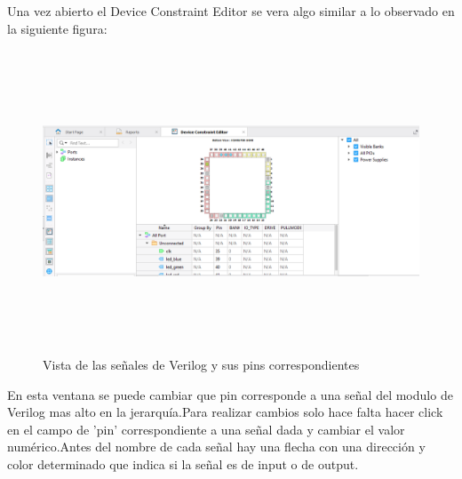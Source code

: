 \documentclass{article}
\begin{document}
 Una vez abierto el Device Constraint Editor se vera algo similar a lo observado en la siguiente figura:
 	\begin{figure}[H]
 	\centering
	\includegraphics[height=9cm,width=16cm]{Imagenes/DeviceConstraintEditor.png}
	\caption{Vista de las señales de Verilog y sus pins correspondientes}
	\end{figure}
 En esta ventana se puede cambiar que pin corresponde a una señal del modulo de Verilog mas alto en la jerarquía.Para realizar cambios solo hace falta hacer click en el campo de 'pin' correspondiente a una señal dada y cambiar el valor numérico.Antes del nombre de cada señal hay una flecha con una dirección y color determinado que indica si la señal es de input o de output.
 
\end{document}

